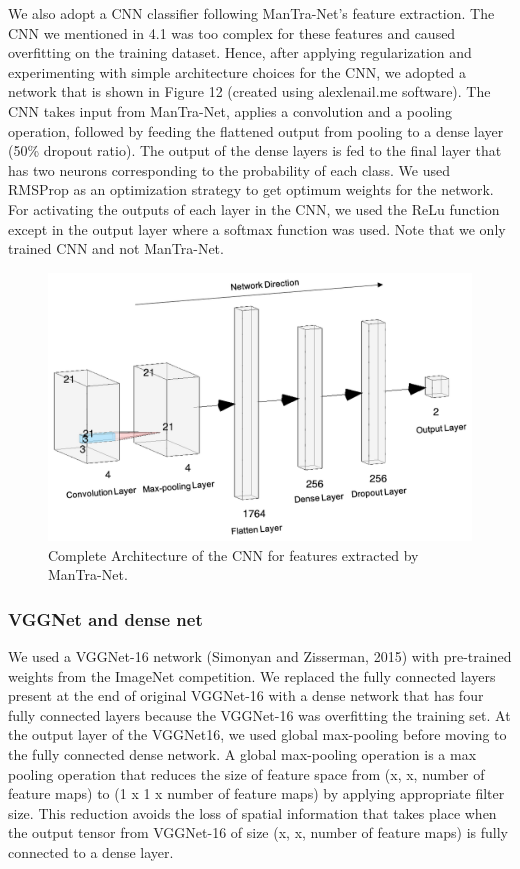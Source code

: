 \documentclass[11pt]{article}
\begin{document}
We also adopt a CNN classifier following ManTra-Net's feature extraction. The CNN we mentioned in 4.1 was too complex for these features and caused overfitting on the training dataset. Hence, after applying regularization and experimenting with simple architecture choices for the CNN, we adopted a network that is shown in Figure 12 (created using alexlenail.me software). The CNN takes input from ManTra-Net, applies a convolution and a pooling operation, followed by feeding the flattened output from pooling to a dense layer (50\% dropout ratio). The output of the dense layers is fed to the final layer that has two neurons corresponding to the probability of each class. We used RMSProp as an optimization strategy to get optimum weights for the network. For activating the outputs of each layer in the CNN, we used the ReLu function except in the output layer where a softmax function was used. Note that we only trained CNN and not ManTra-Net.

\begin{figure}[!htb]
    \centering
        \includegraphics[scale=.65]{figures/figure_6.png}
    \caption{Complete Architecture of the CNN for features extracted by ManTra-Net.}
    \label{fig:12}
\end{figure}

\subsubsection{VGGNet and dense net}

We used a VGGNet-16 network (Simonyan and Zisserman, 2015) with pre-trained weights from the ImageNet competition. We replaced the fully connected layers present at the end of original VGGNet-16 with a dense network that has four fully connected layers because the VGGNet-16 was overfitting the training set. At the output layer of the VGGNet16, we used global max-pooling before moving to the fully connected dense network. A global max-pooling operation is a max pooling operation that reduces the size of feature space from (x, x, number of feature maps) to (1 x 1 x number of feature maps) by applying appropriate filter size. This reduction avoids the loss of spatial information that takes place when the output tensor from VGGNet-16 of size (x, x, number of feature maps) is fully connected to a dense layer.
\end{document}
